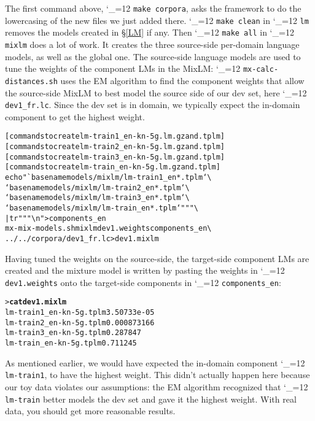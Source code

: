 \documentclass[11pt,letterpaper]{article}
\newcommand{\bs}{\textbackslash{}}
\def\code{\begingroup\catcode`\_=12 \codex}
\newcommand{\codex}[1]{\texttt{#1}\endgroup}
\begin{document}
The first command above, \code{make corpora}, asks the framework to do the
lowercasing of the new files we just added there.  \code{make clean} in
\code{lm} removes the models created in \S\ref{LM} if any. Then \code{make all}
in \code{mixlm} does a
lot of work.  It creates the three source-side per-domain language models, as
well as the global one.  The source-side language models are used to tune the
weights of the component LMs in the MixLM: \code{mx-calc-distances.sh} uses the
EM algorithm to find the component weights that allow the source-side MixLM to
best model the source side of our dev set, here \code{dev1_fr.lc}.  Since the
dev set is in domain, we typically expect the in-domain component to get the
highest weight.

\begin{small}
\begin{alltt}
   [commands to create lm-train1_en-kn-5g.lm.gz and .tplm]
   [commands to create lm-train2_en-kn-5g.lm.gz and .tplm]
   [commands to create lm-train3_en-kn-5g.lm.gz and .tplm]
   [commands to create lm-train_en-kn-5g.lm.gz and .tplm]
   echo "`basename models/mixlm/lm-train1_en*.tplm` \bs
         `basename models/mixlm/lm-train2_en*.tplm` \bs
         `basename models/mixlm/lm-train3_en*.tplm` \bs
         `basename models/mixlm/lm-train_en*.tplm`" "" \bs
      | tr " " "\bs{}n" > components_en
   mx-mix-models.sh mixlm dev1.weights components_en \bs
      ../../corpora/dev1_fr.lc > dev1.mixlm
\end{alltt}
\end{small}

Having tuned the weights on the source-side, the target-side component LMs are
created and the mixture model is written by pasting the weights in
\code{dev1.weights} onto the target-side components in \code{components_en}:
\begin{small}
\begin{alltt}
   > \textbf{cat dev1.mixlm}
   lm-train1_en-kn-5g.tplm     3.50733e-05
   lm-train2_en-kn-5g.tplm     0.000873166
   lm-train3_en-kn-5g.tplm     0.287847
   lm-train_en-kn-5g.tplm      0.711245
\end{alltt}
\end{small}

As mentioned earlier, we would have expected the in-domain component
\code{lm-train1}, to have
the highest weight.  This didn't actually happen here because our toy data
violates our assumptions: the EM algorithm recognized that \code{lm-train}
better models the dev set and gave it the highest weight.  With real data,
you should get more reasonable results.
\end{document}
